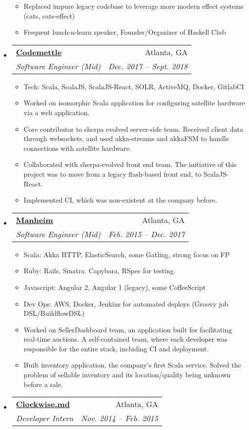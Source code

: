 \documentclass[letterpaper,11pt]{article}
\makeatletter
\newcommand{\resitem}[1]{\item #1 \vspace{-2pt}}
\newcommand{\ressubheading}[4]{
\begin{tabular*}{6.5in}{l@{\extracolsep{\fill}}r}
		\textbf{#1} & #2 \\
		\textit{#3} & \textit{#4} \\
\end{tabular*}\vspace{-6pt}}
\makeatother
\begin{document}
\begin{itemize}
{\begin{itemize}
{        facilitating a single insurance carrier to generalize among an ever growing group of new carriers, each with their own response models
        and laws}
        \resitem{Replaced impure legacy codebase to leverage more modern effect systems (cats, cats-effect)}
        \resitem{Frequent lunch-n-learn speaker, Founder/Organizer of Haskell Club}
    \end{itemize}
    }
\item
  \ressubheading{\href{http://www.codemettle.com/}{Codemettle}}{Atlanta, GA}{Software Engineer (Mid)}{Dec. 2017 -- Sept. 2018}
    { \footnotesize
    \begin{itemize}
        \resitem{Tech: Scala, ScalaJS, ScalaJS-React, SOLR, ActiveMQ, Docker, GitlabCI}
        \resitem{Worked on isomorphic Scala application for configuring satellite hardware via a web application.}
        \resitem{Core contributor to sherpa evolved server-side team. Received client data through websockets, and used akka-streams
        and akkaFSM to handle connections with satellite hardware.}
        \resitem{Collaborated with sherpa-evolved front end team. The initiative of this project was to move from a legacy flash-based front end,
        to ScalaJS-React.}
        \resitem{Implemented CI, which was non-existent at the company before.}
    \end{itemize}
    }
\item
  \ressubheading{\href{http://www.manheim.com/}{Manheim}}{Atlanta, GA}{Software Engineer (Mid)}{Feb. 2015 -- Dec. 2017}
    { \footnotesize
    \begin{itemize}
        \resitem{Scala: Akka HTTP, ElasticSearch, some Gatling, strong focus on FP}
        \resitem{Ruby: Rails, Sinatra. Capybara, RSpec for testing.}
        \resitem{Javascript: Angular 2, Angular 1 (legacy), some CoffeeScript}
        \resitem{Dev Ops: AWS, Docker, Jenkins for automated deploys (Groovy job DSL/BuildflowDSL)}
        \resitem{Worked on SellerDashboard team, an application built for facilitating real-time auctions.
        A self-contained team, where each developer was responsible for the
        entire stack, including CI and deployment.}
        \resitem{Built inventory application, the company's first Scala
        service. Solved the problem of sellable inventory and its
        location/quality being unknown before a sale.}
    \end{itemize}
    }
\item
\ressubheading{\href{http://www.clockwise.md/}{Clockwise.md}}{Atlanta, GA}{Developer Intern}{Nov. 2014 -- Feb. 2015}

\end{itemize}
\end{document}
